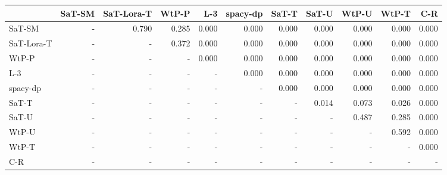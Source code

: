 \begin{tabular}{lrrrrrrrrrr}
\toprule
 & SaT-SM & SaT-Lora-T & WtP-P & L-3 & spacy-dp & SaT-T & SaT-U & WtP-U & WtP-T & C-R \\
\midrule
SaT-SM & - & 0.790 & 0.285 & 0.000 & 0.000 & 0.000 & 0.000 & 0.000 & 0.000 & 0.000 \\
SaT-Lora-T & - & - & 0.372 & 0.000 & 0.000 & 0.000 & 0.000 & 0.000 & 0.000 & 0.000 \\
WtP-P & - & - & - & 0.000 & 0.000 & 0.000 & 0.000 & 0.000 & 0.000 & 0.000 \\
L-3 & - & - & - & - & 0.000 & 0.000 & 0.000 & 0.000 & 0.000 & 0.000 \\
spacy-dp & - & - & - & - & - & 0.000 & 0.000 & 0.000 & 0.000 & 0.000 \\
SaT-T & - & - & - & - & - & - & 0.014 & 0.073 & 0.026 & 0.000 \\
SaT-U & - & - & - & - & - & - & - & 0.487 & 0.285 & 0.000 \\
WtP-U & - & - & - & - & - & - & - & - & 0.592 & 0.000 \\
WtP-T & - & - & - & - & - & - & - & - & - & 0.000 \\
C-R & - & - & - & - & - & - & - & - & - & - \\
\bottomrule
\end{tabular}

